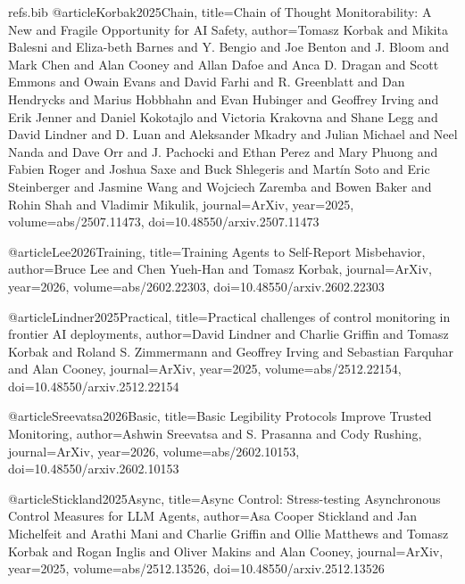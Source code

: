 \begin{filecontents}{refs.bib}
@article{Korbak2025Chain,
title={Chain of Thought Monitorability: A New and Fragile Opportunity for AI Safety},
author={Tomasz Korbak and Mikita Balesni and Eliza-beth Barnes and Y. Bengio and Joe Benton and J. Bloom and Mark Chen and Alan Cooney and Allan Dafoe and Anca D. Dragan and Scott Emmons and Owain Evans and David Farhi and R. Greenblatt and Dan Hendrycks and Marius Hobbhahn and Evan Hubinger and Geoffrey Irving and Erik Jenner and Daniel Kokotajlo and Victoria Krakovna and Shane Legg and David Lindner and D. Luan and Aleksander Mkadry and Julian Michael and Neel Nanda and Dave Orr and J. Pachocki and Ethan Perez and Mary Phuong and Fabien Roger and Joshua Saxe and Buck Shlegeris and Martín Soto and Eric Steinberger and Jasmine Wang and Wojciech Zaremba and Bowen Baker and Rohin Shah and Vladimir Mikulik},
journal={ArXiv},
year={2025},
volume={abs/2507.11473},
doi={10.48550/arxiv.2507.11473}
}

@article{Lee2026Training,
title={Training Agents to Self-Report Misbehavior},
author={Bruce Lee and Chen Yueh-Han and Tomasz Korbak},
journal={ArXiv},
year={2026},
volume={abs/2602.22303},
doi={10.48550/arxiv.2602.22303}
}

@article{Lindner2025Practical,
title={Practical challenges of control monitoring in frontier AI deployments},
author={David Lindner and Charlie Griffin and Tomasz Korbak and Roland S. Zimmermann and Geoffrey Irving and Sebastian Farquhar and Alan Cooney},
journal={ArXiv},
year={2025},
volume={abs/2512.22154},
doi={10.48550/arxiv.2512.22154}
}

@article{Sreevatsa2026Basic,
title={Basic Legibility Protocols Improve Trusted Monitoring},
author={Ashwin Sreevatsa and S. Prasanna and Cody Rushing},
journal={ArXiv},
year={2026},
volume={abs/2602.10153},
doi={10.48550/arxiv.2602.10153}
}

@article{Stickland2025Async,
title={Async Control: Stress-testing Asynchronous Control Measures for LLM Agents},
author={Asa Cooper Stickland and Jan Michelfeit and Arathi Mani and Charlie Griffin and Ollie Matthews and Tomasz Korbak and Rogan Inglis and Oliver Makins and Alan Cooney},
journal={ArXiv},
year={2025},
volume={abs/2512.13526},
doi={10.48550/arxiv.2512.13526}
}
\end{filecontents}

\documentclass{article}
\usepackage{adjustbox}


\section*{\textbf{AI Control}: Trusted vs. Untrusted Monitoring, Collusion, and Evasion}


